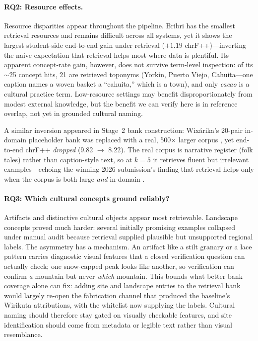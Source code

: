 \documentclass[11pt]{article}
\begin{document}
\paragraph{RQ2: Resource effects.}
Resource disparities appear throughout the pipeline. Bribri has the smallest
retrieval resources and remains difficult across all systems, yet it shows
the largest student-side end-to-end gain under retrieval ($+1.19$
chrF++)---inverting the naive expectation that retrieval helps most where
data is plentiful. Its apparent concept-rate gain, however, does not survive
term-level inspection: of its $\sim$25 concept hits, 21 are retrieved
toponyms (Yorkín, Puerto Viejo, Cahuita---one caption names a woven basket
a ``cahuita,'' which is a town), and only \emph{cacao} is a cultural
practice term. Low-resource settings may benefit disproportionately from
modest external knowledge, but the benefit we can verify here is in
reference overlap, not yet in grounded cultural naming.

A similar inversion appeared in Stage~2 bank construction: Wixárika's
20-pair in-domain placeholder bank was replaced with a real, 500$\times$
larger corpus \citep{mager2018wixarika}, yet end-to-end chrF++
\emph{dropped} (9.82 $\to$ 8.22). The real corpus is narrative
register (folk tales) rather than caption-style text, so at $k{=}5$ it
retrieves fluent but irrelevant examples---echoing the winning 2026
submission's finding that retrieval helps only when the corpus is both
large \emph{and} in-domain \citep{dhawan2026gators}.

\paragraph{RQ3: Which cultural concepts ground reliably?}
Artifacts and distinctive cultural objects appear most retrievable. Landscape
concepts proved much harder: several initially promising examples collapsed
under manual audit because retrieval supplied plausible but unsupported
regional labels. The asymmetry has a mechanism. An artifact like a stilt
granary or a lace pattern carries diagnostic visual features that a closed
verification question can actually check; one snow-capped peak looks like
another, so verification can confirm \emph{a} mountain but never \emph{which}
mountain. This bounds what better bank coverage alone can fix: adding site
and landscape entries to the retrieval bank would largely re-open the
fabrication channel that produced the baseline's Wirikuta attributions,
with the whitelist now supplying the labels. Cultural naming should
therefore stay gated on visually checkable features, and site
identification should come from metadata or legible text rather than
visual resemblance.
\end{document}
